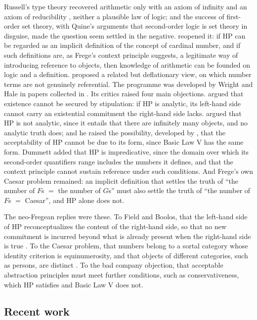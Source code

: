 \documentclass{situationist-preprint}
\begin{document}
Russell's type theory recovered arithmetic only with an axiom of infinity and an axiom of reducibility \citep{WhiteheadRussell1910}, neither a plausible law of logic; and the success of first-order set theory, with Quine's arguments that second-order logic is set theory in disguise, made the question seem settled in the negative. \citet{Wright1983} reopened it: if HP can be regarded as an implicit definition of the concept of cardinal number, and if such definitions are, as Frege's context principle suggests, a legitimate way of introducing reference to objects, then knowledge of arithmetic can be founded on logic and a definition. \citet{Hodes1984} proposed a related but deflationary view, on which number terms are not genuinely referential. The programme was developed by Wright and Hale in papers collected in \citet{HaleWright2001}. Its critics raised four main objections. \citet{Field1984} argued that existence cannot be secured by stipulation: if HP is analytic, its left-hand side cannot carry an existential commitment the right-hand side lacks. \citet{Boolos1990,Boolos1997} argued that HP is not analytic, since it entails that there are infinitely many objects, and no analytic truth does; and he raised the possibility, developed by \citet{Dummett1991}, that the acceptability of HP cannot be due to its form, since Basic Law V has the same form. Dummett added that HP is impredicative, since the domain over which its second-order quantifiers range includes the numbers it defines, and that the context principle cannot sustain reference under such conditions. And Frege's own Caesar problem remained: an implicit definition that settles the truth of \enquote{the number of $F$s $=$ the number of $G$s} must also settle the truth of \enquote{the number of $F$s $=$ Caesar}, and HP alone does not.

The neo-Fregean replies were these. To Field and Boolos, that the left-hand side of HP reconceptualizes the content of the right-hand side, so that no new commitment is incurred beyond what is already present when the right-hand side is true \citep{Wright1997}. To the Caesar problem, that numbers belong to a sortal category whose identity criterion is equinumerosity, and that objects of different categories, such as persons, are distinct \citep[ch.~14]{HaleWright2001}. To the bad company objection, that acceptable abstraction principles must meet further conditions, such as conservativeness, which HP satisfies and Basic Law V does not.

\subsection{Recent work}
\end{document}
